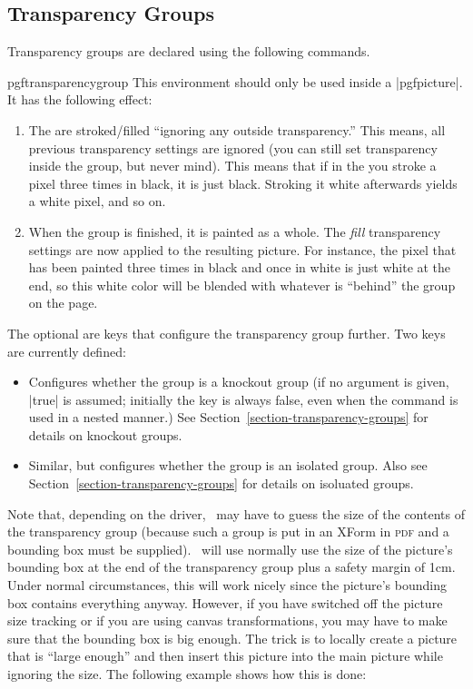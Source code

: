 \subsection{Transparency Groups}

Transparency groups are declared using the following commands.

\begin{environment}{{pgftransparencygroup}}
  This environment should only be used inside a |{pgfpicture}|. It has
  the following effect:
  \begin{enumerate}
  \item The  are stroked/filled
    ``ignoring any outside transparency.'' This means, all previous
    transparency settings are ignored (you can still set transparency
    inside the group, but never mind). This means that if in the
     you stroke a pixel three times in
    black, it is just black. Stroking it white afterwards yields a
    white pixel, and so on.
  \item When the group is finished, it is painted as a whole. The
    \emph{fill} transparency settings are now applied to the resulting
    picture. For instance, the pixel that has been painted three times
    in black and once in white is just white at the end, so this white
    color will be blended with whatever is ``behind'' the group on the
    page.
  \end{enumerate}
  
  The optional  are keys that configure the transparency
  group further. Two keys are currently defined:
  \begin{itemize}
  \item {} Configures
    whether the group is a knockout group (if no argument is given,
    |true| is assumed; initially the key is always false, even when
    the command is used in a nested manner.) See
    Section~\ref{section-transparency-groups} for details on knockout groups.
  \item {} Similar, but
    configures whether the group is an isolated group. Also see
    Section~\ref{section-transparency-groups} for details on isoluated groups.
  \end{itemize}
    
  Note that, depending on the driver, \pgfname\ may have to guess the
  size of the contents of the transparency group (because such a group
  is put in an XForm in \textsc{pdf} and a bounding box must be
  supplied). \pgfname\ will use normally use the size of the picture's
  bounding box at the end of the transparency group plus a safety
  margin of 1cm. Under normal circumstances, this will work nicely
  since the picture's bounding box contains everything
  anyway. However, if you have switched off the picture size tracking
  or if you are using canvas transformations, you may have to make
  sure that the bounding box is big enough. The trick is to locally
  create a picture that is ``large enough'' and then insert this
  picture into the main picture while ignoring the size. The following
  example shows how this is done:



\end{environment}
